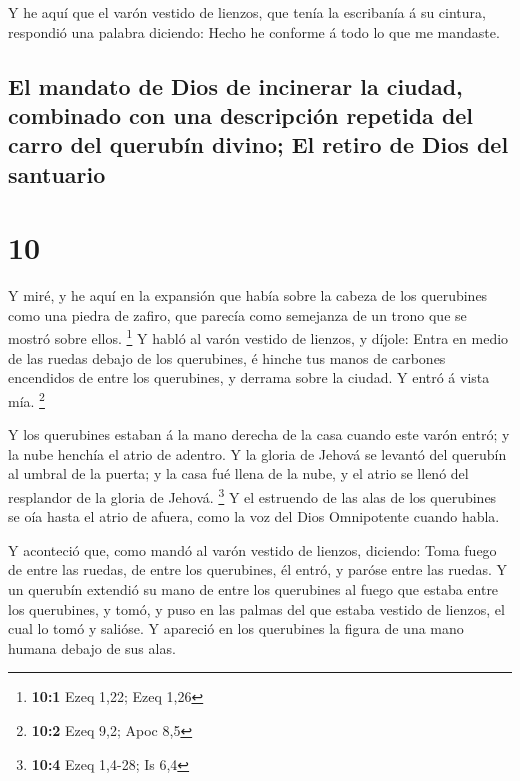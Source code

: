  Y he aquí que el varón vestido de lienzos, que tenía la
escribanía á su cintura, respondió una palabra diciendo: Hecho he
conforme á todo lo que me mandaste.

\hypertarget{el-mandato-de-dios-de-incinerar-la-ciudad-combinado-con-una-descripciuxf3n-repetida-del-carro-del-querubuxedn-divino-el-retiro-de-dios-del-santuario}{%
\subsection{El mandato de Dios de incinerar la ciudad, combinado con una
descripción repetida del carro del querubín divino; El retiro de Dios
del
santuario}\label{el-mandato-de-dios-de-incinerar-la-ciudad-combinado-con-una-descripciuxf3n-repetida-del-carro-del-querubuxedn-divino-el-retiro-de-dios-del-santuario}}

\hypertarget{section-9}{%
\section{10}\label{section-9}}

 Y miré, y he aquí en la expansión que había sobre la
cabeza de los querubines como una piedra de zafiro, que parecía como
semejanza de un trono que se mostró sobre ellos. \footnote{\textbf{10:1}
  Ezeq 1,22; Ezeq 1,26}  Y habló al varón vestido de
lienzos, y díjole: Entra en medio de las ruedas debajo de los
querubines, é hinche tus manos de carbones encendidos de entre los
querubines, y derrama sobre la ciudad. Y entró á vista mía. \footnote{\textbf{10:2}
  Ezeq 9,2; Apoc 8,5}

 Y los querubines estaban á la mano derecha de la casa
cuando este varón entró; y la nube henchía el atrio de adentro.
 Y la gloria de Jehová se levantó del querubín al umbral
de la puerta; y la casa fué llena de la nube, y el atrio se llenó del
resplandor de la gloria de Jehová. \footnote{\textbf{10:4} Ezeq 1,4-28;
  Is 6,4}  Y el estruendo de las alas de los querubines se
oía hasta el atrio de afuera, como la voz del Dios Omnipotente cuando
habla.

 Y aconteció que, como mandó al varón vestido de lienzos,
diciendo: Toma fuego de entre las ruedas, de entre los querubines, él
entró, y paróse entre las ruedas.  Y un querubín extendió
su mano de entre los querubines al fuego que estaba entre los
querubines, y tomó, y puso en las palmas del que estaba vestido de
lienzos, el cual lo tomó y salióse.  Y apareció en los
querubines la figura de una mano humana debajo de sus alas.

